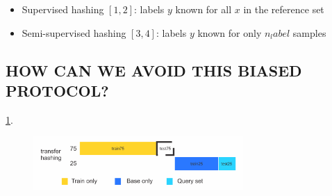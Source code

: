\documentclass[conference]{IEEEtran}
\begin{document}
\begin{itemize}
\item Supervised hashing $[1, 2]$: labels $y$ known for all $x$ in the reference set
\item Semi-supervised hashing $[3, 4]$: labels $y$ known for only $n_label$ samples

\end{itemize}
 
\subsection{HOW CAN WE AVOID THIS BIASED PROTOCOL?}

\ref{fig:13}.  
\begin{figure}[htp]\centering
\label{fig:13}
 \includegraphics[width=8cm]{dash/13.png} 

\end{figure}


 

\end{document}
